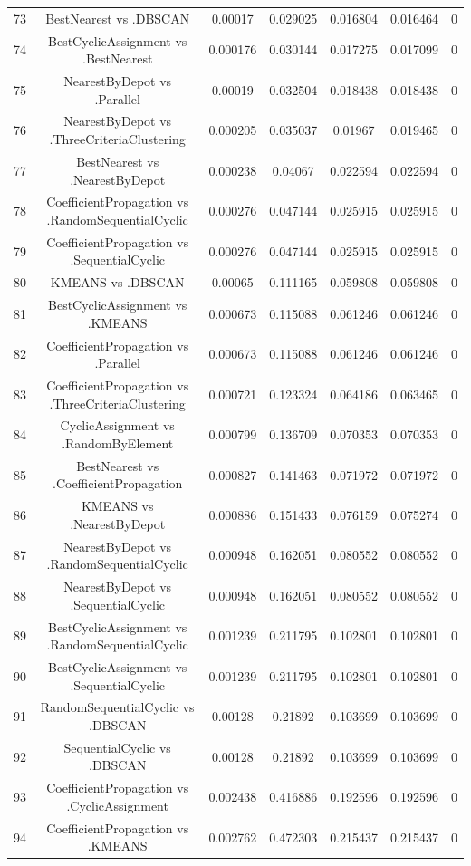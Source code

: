 \documentclass[a4paper,10pt]{article}
\begin{document}
\begin{landscape}
\begin{table}[!htp]
\begin{tabular}{ccccccc}
73&BestNearest vs .DBSCAN&0.00017&0.029025&0.016804&0.016464&0\\
74&BestCyclicAssignment vs .BestNearest&0.000176&0.030144&0.017275&0.017099&0\\
75&NearestByDepot vs .Parallel&0.00019&0.032504&0.018438&0.018438&0\\
76&NearestByDepot vs .ThreeCriteriaClustering&0.000205&0.035037&0.01967&0.019465&0\\
77&BestNearest vs .NearestByDepot&0.000238&0.04067&0.022594&0.022594&0\\
78&CoefficientPropagation vs .RandomSequentialCyclic&0.000276&0.047144&0.025915&0.025915&0\\
79&CoefficientPropagation vs .SequentialCyclic&0.000276&0.047144&0.025915&0.025915&0\\
80&KMEANS vs .DBSCAN&0.00065&0.111165&0.059808&0.059808&0\\
81&BestCyclicAssignment vs .KMEANS&0.000673&0.115088&0.061246&0.061246&0\\
82&CoefficientPropagation vs .Parallel&0.000673&0.115088&0.061246&0.061246&0\\
83&CoefficientPropagation vs .ThreeCriteriaClustering&0.000721&0.123324&0.064186&0.063465&0\\
84&CyclicAssignment vs .RandomByElement&0.000799&0.136709&0.070353&0.070353&0\\
85&BestNearest vs .CoefficientPropagation&0.000827&0.141463&0.071972&0.071972&0\\
86&KMEANS vs .NearestByDepot&0.000886&0.151433&0.076159&0.075274&0\\
87&NearestByDepot vs .RandomSequentialCyclic&0.000948&0.162051&0.080552&0.080552&0\\
88&NearestByDepot vs .SequentialCyclic&0.000948&0.162051&0.080552&0.080552&0\\
89&BestCyclicAssignment vs .RandomSequentialCyclic&0.001239&0.211795&0.102801&0.102801&0\\
90&BestCyclicAssignment vs .SequentialCyclic&0.001239&0.211795&0.102801&0.102801&0\\
91&RandomSequentialCyclic vs .DBSCAN&0.00128&0.21892&0.103699&0.103699&0\\
92&SequentialCyclic vs .DBSCAN&0.00128&0.21892&0.103699&0.103699&0\\
93&CoefficientPropagation vs .CyclicAssignment&0.002438&0.416886&0.192596&0.192596&0\\
94&CoefficientPropagation vs .KMEANS&0.002762&0.472303&0.215437&0.215437&0\\

\end{tabular}
\end{table}
\end{landscape}
\end{document}
